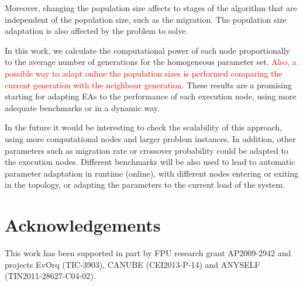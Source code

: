 \documentclass[final,1p,times]{elsarticle}
\begin{document}

Moreover, changing the population size affects to stages
of the algorithm that are independent of the population size, such as
the migration. The population size adaptation is also affected by the problem to solve.

In this work, we calculate the computational power of each node proportionally 
to the average number of generations for the homogeneous parameter set. \textcolor{red}{Also, a possible way to adapt online the population sizes is performed comparing the current generation with the neighbour generation}. These results are a promising starting for adapting EAs to the
performance of each execution node, using more adequate benchmarks or in a dynamic way. 

In the future it would be interesting to check the scalability of this
approach, using more computational nodes and larger problem
instances. In addition, other parameters such as migration rate or
crossover probability could be adapted to the execution
nodes. Different benchmarks will be also used to lead to automatic
parameter adaptation in runtime (online), with different nodes entering or
exiting in the topology, or adapting the parameters to the current load of the
system. 

\section*{Acknowledgements}
This work has been supported in part by FPU research grant AP2009-2942 and projects EvOrq (TIC-3903), CANUBE (CEI2013-P-14) and ANYSELF (TIN2011-28627-C04-02).

\end{document}
